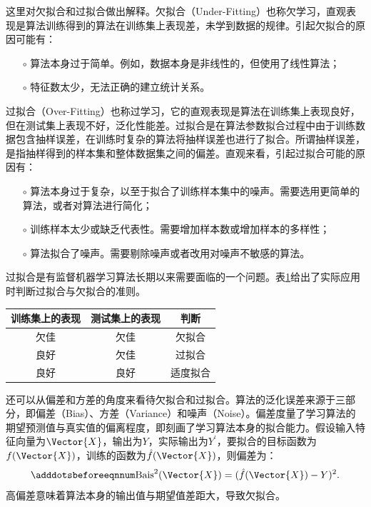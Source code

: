 这里对欠拟合和过拟合做出解释。欠拟合（Under-Fitting）也称欠学习，直观表现是算法训练得到的算法在训练集上表现差，未学到数据的规律。引起欠拟合的原因可能有：
\begin{enumerate}
  \item[$\circ$] 算法本身过于简单。例如，数据本身是非线性的，但使用了线性算法；
  \item[$\circ$] 特征数太少，无法正确的建立统计关系。
\end{enumerate}

过拟合（Over-Fitting）也称过学习，它的直观表现是算法在训练集上表现良好，但在测试集上表现不好，泛化性能差。过拟合是在算法参数拟合过程中由于训练数据包含抽样误差，在训练时复杂的算法将抽样误差也进行了拟合。所谓抽样误差，是指抽样得到的样本集和整体数据集之间的偏差。直观来看，引起过拟合可能的原因有：
\begin{enumerate}
  \item[$\circ$] 算法本身过于复杂，以至于拟合了训练样本集中的噪声。需要选用更简单的算法，或者对算法进行简化；
  \item[$\circ$] 训练样本太少或缺乏代表性。需要增加样本数或增加样本的多样性；
  \item[$\circ$] 算法拟合了噪声。需要剔除噪声或者改用对噪声不敏感的算法。
\end{enumerate}

过拟合是有监督机器学习算法长期以来需要面临的一个问题。表\ref{tab:ml_overfit}给出了实际应用时判断过拟合与欠拟合的准则。
\begin{table}[!htbp]
  \label{tab:ml_overfit}
  \centering
  \footnotesize
  \begin{tabular}{ccc}
    \toprule
    训练集上的表现 & 测试集上的表现 & 判断 \\
    \midrule
    欠佳 & 欠佳 & 欠拟合 \\
    良好 & 欠佳 & 过拟合 \\
    良好 & 良好 & 适度拟合 \\
    \bottomrule
  \end{tabular}
\end{table}

还可以从偏差和方差的角度来看待欠拟合和过拟合。算法的泛化误差来源于三部分，即偏差（Bias）、方差（Variance）和噪声（Noise）。偏差度量了学习算法的期望预测值与真实值的偏离程度，即刻画了学习算法本身的拟合能力。假设输入特征向量为$\Vector{X}$，输出为$Y$，实际输出为$Y^{\prime}$，要拟合的目标函数为$f(\Vector{X})$，训练的函数为$\hat{f}(\Vector{X})$，则偏差为：
\begin{equation}\adddotsbeforeeqnnum
  \label{eq:ml_bias}
  \text{Bais}^2(\Vector{X})=(\hat{f}(\Vector{X})-Y)^2.
\end{equation}
高偏差意味着算法本身的输出值与期望值差距大，导致欠拟合。


